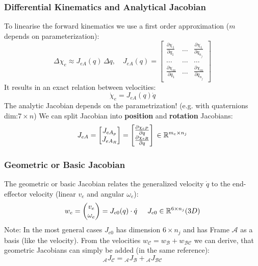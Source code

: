 \documentclass[fontsize=6pt,DIV=calc,a4paper,ngerman]{scrartcl}
\begin{document}
\begin{multicols*}{4}
	\subsubsection{Differential Kinematics and Analytical Jacobian}
	To linearise the forward kinematics we use a first order approximation ($m$ depends on parameterization):
	$$\Delta \chi_e \approx J_{eA}(q)\, \Delta q, \quad J_{eA}(q)=
		\left[\begin{smallmatrix}
				\frac{\partial \chi_1}{\partial q_1} & \dots & \frac{\partial \chi_1}{\partial q_{n_j}}\\
				\dots & \dots & \dots \\
				\frac{\partial \chi_m}{\partial q_1} & \dots  & \frac{\partial \chi_m}{\partial q_{n_j}}
			\end{smallmatrix}\right]$$
	It results in an exact relation between velocities:
	$$\dot{\chi}_e =J_{eA}(q)\dot{q}$$
The analytic Jacobian depends on the parametrization! (e.g. with quaternions dim:$7\times n$)
	We can split Jacobian into \textbf{position} and \textbf{rotation} Jacobians:
	$$J_{eA} = \begin{bmatrix}
			J_{eA_p} \\ J_{eA_R}
		\end{bmatrix}
		= \begin{bmatrix}
			\frac{\partial \chi_{eP}}{\partial q} \\
			\frac{\partial \chi_{eR}}{\partial q}
		\end{bmatrix}
		\hspace{0.5mm}
		\in \mathbb{R}^{m_e \times n_j}
	$$
	\subsubsection{Geometric or Basic Jacobian}
	The geometric or basic Jacobian relates the generalized velocity $\dot{q}$ to the end-effector velocity (linear $v_e$ and angular $\omega_e$):
	$$w_e = \begin{pmatrix}v_e \\ \omega_e\end{pmatrix} = J_{e0}(q)\cdot \dot{q} \hspace{0.5cm} J_{e0} \in \mathbb{R}^{6 \times n_j} (3D)$$
	Note: In the most general cases $J_{e0}$ has dimension $6\times n_j$ and has Frame $\mathcal{A}$ as a basis (like the velocity).
	From the velocities $w_\mathcal{C} = w_\mathcal{B} + w_\mathcal{BC}$ we can derive, that geometric Jacobians can simply be added (in the same reference):
	$${}_\mathcal{A}J_\mathcal{C} = {}_\mathcal{A}J_\mathcal{B} +{}_\mathcal{A}J_\mathcal{BC}$$


\end{multicols*}
\end{document}

